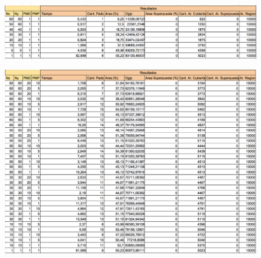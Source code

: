 \begin{center}
\includegraphics[width=1\textwidth]{imagenes/G_45G100x100_pocos}
\end{center}

\begin{center}
\includegraphics[width=1\textwidth]{imagenes/GML_45G100x100_pocos}
\end{center}

